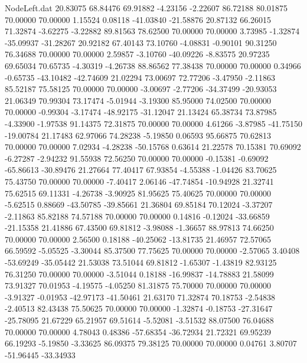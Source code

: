 \begin{filecontents}{NodeLeft.dat}
  20.83075   68.84476   69.91882    -4.23156   -2.22607   86.72188   80.01875   70.00000   70.00000    1.15524    0.08118  -41.03840  -21.58876
  20.87132   66.26015   71.32874    -3.62275   -3.22882   89.81563   78.62500   70.00000   70.00000    3.73985   -1.32874  -35.09937  -31.28267
  20.92182   67.40143   73.10760    -4.08831   -0.90101   90.31250   76.34688   70.00000   70.00000    2.59857   -3.10760  -40.09226   -8.83575
  20.97235   69.65034   70.65735    -4.30319   -4.26738   88.86562   77.38438   70.00000   70.00000    0.34966   -0.65735  -43.10482  -42.74609
  21.02294   73.00697   72.77206    -3.47950   -2.11863   85.52187   75.58125   70.00000   70.00000   -3.00697   -2.77206  -34.37499  -20.93053
  21.06349   70.99304   73.17474    -5.01944   -3.19300   85.95000   74.02500   70.00000   70.00000   -0.99304   -3.17474  -48.92175  -31.12047
  21.13424   65.38734   73.87985    -4.33900   -1.97538   91.14375   72.31875   70.00000   70.00000    4.61266   -3.87985  -41.75150  -19.00784
  21.17483   62.97066   74.28238    -5.19850    0.06593   95.66875   70.62813   70.00000   70.00000    7.02934   -4.28238  -50.15768    0.63614
  21.22578   70.15381   70.69092    -6.27287   -2.94232   91.55938   72.56250   70.00000   70.00000   -0.15381   -0.69092  -65.86613  -30.89476
  21.27664   77.40417   67.93854    -4.55388   -1.04426   83.70625   75.43750   70.00000   70.00000   -7.40417    2.06146  -47.74854  -10.94928
  21.32741   75.62515   69.11331    -4.26738   -3.90925   81.95625   75.40625   70.00000   70.00000   -5.62515    0.88669  -43.50785  -39.85661
  21.36804   69.85184   70.12024    -3.37207   -2.11863   85.82188   74.57188   70.00000   70.00000    0.14816   -0.12024  -33.66859  -21.15358
  21.41886   67.43500   69.81812    -3.98088   -1.36657   88.97813   74.66250   70.00000   70.00000    2.56500    0.18188  -40.25062  -13.81735
  21.46957   72.57065   66.59592    -5.05525   -3.30044   85.37500   77.75625   70.00000   70.00000   -2.57065    3.40408  -53.69249  -35.05442
  21.53038   73.51044   69.81812    -1.65307   -1.43819   82.93125   76.31250   70.00000   70.00000   -3.51044    0.18188  -16.99837  -14.78883
  21.58099   73.91327   70.01953    -4.19575   -4.05250   81.31875   75.70000   70.00000   70.00000   -3.91327   -0.01953  -42.97173  -41.50461
  21.63170   71.32874   70.18753    -2.54838   -2.40513   82.43438   75.50625   70.00000   70.00000   -1.32874   -0.18753  -27.31647  -25.78095
  21.67229   65.21957   69.51614    -5.52081   -3.51532   88.07500   76.04688   70.00000   70.00000    4.78043    0.48386  -57.68354  -36.72934
  21.72321   69.95239   66.19293    -5.19850   -3.33625   86.09375   79.38125   70.00000   70.00000    0.04761    3.80707  -51.96445  -33.34933

\end{filecontents}
